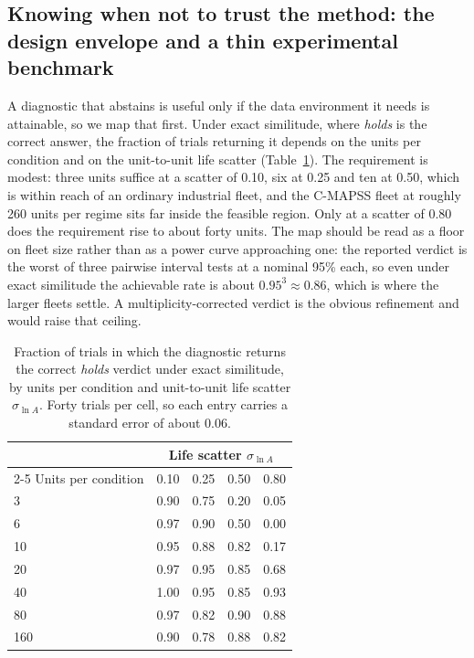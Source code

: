 \subsection{Knowing when not to trust the method: the design envelope and a thin experimental
benchmark}\label{sec:res-diag}
A diagnostic that abstains is useful only if the data environment it needs is attainable, so we map
that first. Under exact similitude, where \emph{holds} is the correct answer, the fraction of trials
returning it depends on the units per condition and on the unit-to-unit life scatter
(Table~\ref{tab:power}). The requirement is modest: three units suffice at a scatter of 0.10, six at
0.25 and ten at 0.50, which is within reach of an ordinary industrial fleet, and the C-MAPSS fleet
at roughly 260 units per regime sits far inside the feasible region. Only at a scatter of 0.80 does
the requirement rise to about forty units. The map should be read as a floor on fleet size rather
than as a power curve approaching one: the reported verdict is the worst of three pairwise interval
tests at a nominal 95\% each, so even under exact similitude the achievable rate is about
$0.95^3\approx0.86$, which is where the larger fleets settle. A multiplicity-corrected verdict is
the obvious refinement and would raise that ceiling.

\begin{table}[t]\centering\footnotesize
\setlength{\tabcolsep}{12pt}\renewcommand{\arraystretch}{1.2}
\caption{Fraction of trials in which the diagnostic returns the correct \emph{holds} verdict under
exact similitude, by units per condition and unit-to-unit life scatter $\sigma_{\ln A}$. Forty
trials per cell, so each entry carries a standard error of about 0.06.}\label{tab:power}
\begin{tabular}{@{}lcccc@{}}\toprule
& \multicolumn{4}{c}{Life scatter $\sigma_{\ln A}$} \\\cmidrule(lr){2-5}
Units per condition & 0.10 & 0.25 & 0.50 & 0.80 \\\midrule
3   & 0.90 & 0.75 & 0.20 & 0.05 \\
6   & 0.97 & 0.90 & 0.50 & 0.00 \\
10  & 0.95 & 0.88 & 0.82 & 0.17 \\
20  & 0.97 & 0.95 & 0.85 & 0.68 \\
40  & 1.00 & 0.95 & 0.85 & 0.93 \\
80  & 0.97 & 0.82 & 0.90 & 0.88 \\
160 & 0.90 & 0.78 & 0.88 & 0.82 \\\bottomrule
\end{tabular}
\end{table}

